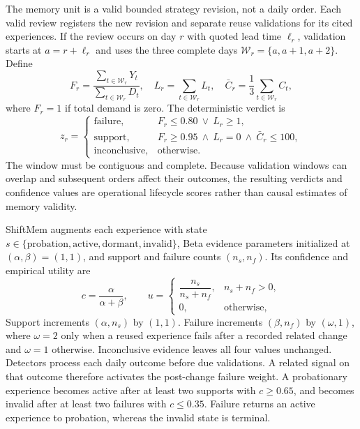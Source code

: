 The memory unit is a valid bounded strategy revision, not a daily order. Each
valid review registers the new revision and separate reuse validations for its
cited experiences. If the review occurs on day $r$ with quoted lead time
$\ell_r$, validation starts at $a=r+\ell_r$ and uses the three complete days
$\mathcal{W}_r=\{a,a+1,a+2\}$. Define
\begin{equation}
 F_r=\frac{\sum_{t\in\mathcal{W}_r}Y_t}
           {\sum_{t\in\mathcal{W}_r}D_t},\quad
 L_r=\sum_{t\in\mathcal{W}_r}L_t,\quad
 \bar C_r=\frac{1}{3}\sum_{t\in\mathcal{W}_r}C_t,
 \label{eq:validation-metrics}
\end{equation}
where $F_r=1$ if total demand is zero. The deterministic verdict is
\begin{equation}
 z_r=\begin{cases}
 \mathrm{failure}, & F_r\leq0.80\ \lor\ L_r\geq1,\\
 \mathrm{support}, & F_r\geq0.95\ \land\ L_r=0\ \land\ \bar C_r\leq100,\\
 \mathrm{inconclusive}, & \text{otherwise}.
 \end{cases}
 \label{eq:validation}
\end{equation}
The window must be contiguous and complete. Because validation windows can
overlap and subsequent orders affect their outcomes, the resulting verdicts and
confidence values are operational lifecycle scores rather than causal estimates
of memory validity.

ShiftMem augments each experience with state
$s\in\{\mathrm{probation},\mathrm{active},\mathrm{dormant},\mathrm{invalid}\}$,
Beta evidence parameters initialized at $(\alpha,\beta)=(1,1)$, and support and
failure counts $(n_s,n_f)$. Its confidence and empirical utility are
\begin{equation}
 c=\frac{\alpha}{\alpha+\beta},\qquad
 u=\begin{cases}
 \dfrac{n_s}{n_s+n_f}, & n_s+n_f>0,\\
 0, & \text{otherwise},
 \end{cases}
 \label{eq:confidence}
\end{equation}
Support increments $(\alpha,n_s)$ by $(1,1)$. Failure increments
$(\beta,n_f)$ by $(\omega,1)$, where $\omega=2$ only when a reused experience
fails after a recorded related change and $\omega=1$ otherwise. Inconclusive
evidence leaves all four values unchanged. Detectors process each daily outcome
before due validations. A related signal on that outcome therefore activates
the post-change failure weight. A probationary
experience becomes active after at least two supports with $c\geq0.65$, and
becomes invalid after at least two failures with $c\leq0.35$. Failure returns an
active experience to probation, whereas the invalid state is terminal.

